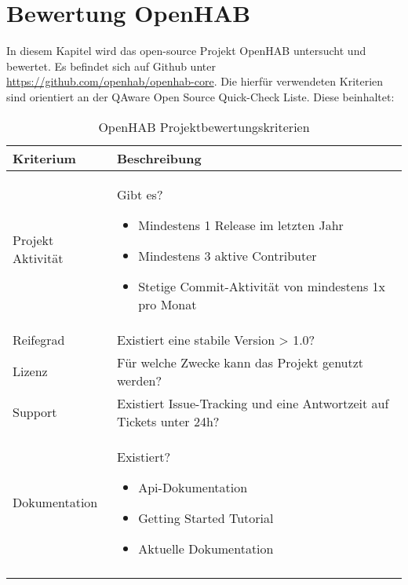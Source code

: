 \section{Bewertung OpenHAB}
In diesem Kapitel wird das open-source Projekt OpenHAB untersucht und bewertet. Es befindet sich auf Github unter \url{https://github.com/openhab/openhab-core}. Die hierfür verwendeten Kriterien sind orientiert an der QAware Open Source Quick-Check Liste.
Diese beinhaltet:
\begin{longtable}{| p{3cm} | p{12cm}|}
	\hline
	\textbf{Kriterium} & \textbf{Beschreibung} \\
	\hline \hline
	\centering Projekt Aktivität & Gibt es?
	\begin{itemize}
		\item Mindestens 1 Release im letzten Jahr
		\item Mindestens 3 aktive Contributer
		\item Stetige Commit-Aktivität von mindestens 1x pro Monat
	\end{itemize}\\
	\hline
	\centering Reifegrad & Existiert eine stabile Version > 1.0?  \\
	\hline
	\centering Lizenz & Für welche Zwecke kann das Projekt genutzt werden? \\
	\hline
	\centering Support & Existiert Issue-Tracking und eine Antwortzeit auf Tickets unter 24h? \\
	\hline
	\centering Dokumentation & Existiert?
	\begin{itemize}
		\item Api-Dokumentation
		\item Getting Started Tutorial
		\item Aktuelle Dokumentation
	\end{itemize} \\
	\hline
	\caption{OpenHAB Projektbewertungskriterien}
	\label{table:openhab-judgement-criteria}
\end{longtable}

